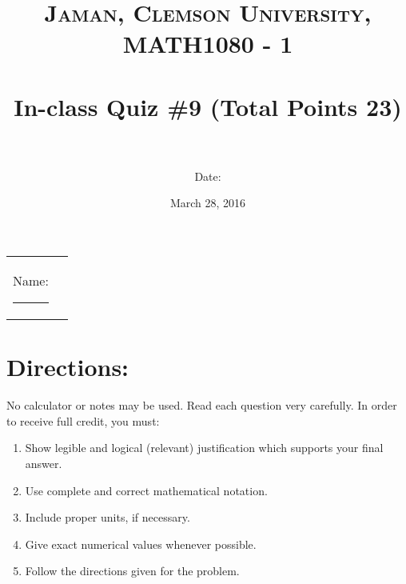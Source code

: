 \documentclass[paper=a4, fontsize=11pt]{scrartcl} %
\title{	
\normalfont \normalsize 
\textsc{Jaman, Clemson University, MATH1080 - 1} \\ [25pt] %
\horrule{0.5pt} \\[0.4cm] %
\huge In-class Quiz \#9 (Total Points 23) \\ %
\horrule{2pt} \\[0.5cm] %
}
\author{Date:} %
\date{\normalsize March 28, 2016} %
\numberwithin{equation}{section} %
\numberwithin{figure}{section} %
\numberwithin{table}{section} %
\begin{document}
\maketitle %

\begin{flushleft}
\begin{tabular}{l l}
Name: \rule{3.2in}{.01cm}  & {}%
\end{tabular}
\end{flushleft}


\section*{\textbf{Directions:}}

No calculator or notes may be used.  Read each question very carefully.  In order to receive full credit, you must:
\begin{enumerate}
\item Show legible and logical (relevant) justification which supports your final answer.
\item Use complete and correct mathematical notation.
\item Include proper units, if necessary.
\item Give exact numerical values whenever possible.
\item Follow the directions given for the problem.
\end{enumerate}
\vspace{.1in}

\newpage
\end{document}
